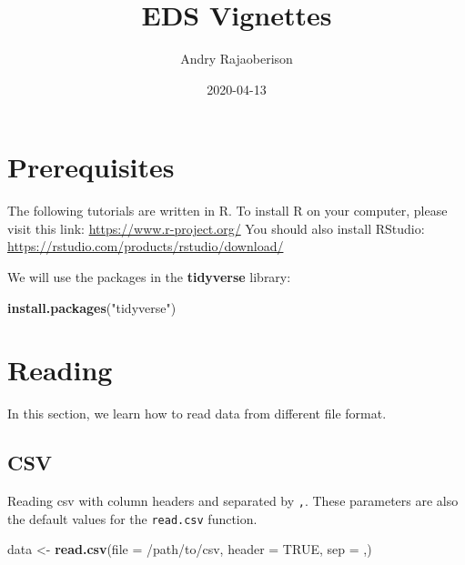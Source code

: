 \documentclass[
]{book}
\title{EDS Vignettes}
\author{Andry Rajaoberison}
\date{2020-04-13}
\newenvironment{Shaded}{\begin{snugshade}}{\end{snugshade}}
\newcommand{\DataTypeTok}[1]{\textcolor[rgb]{0.13,0.29,0.53}{#1}}
\newcommand{\KeywordTok}[1]{\textcolor[rgb]{0.13,0.29,0.53}{\textbf{#1}}}
\newcommand{\NormalTok}[1]{#1}
\newcommand{\OtherTok}[1]{\textcolor[rgb]{0.56,0.35,0.01}{#1}}
\newcommand{\StringTok}[1]{\textcolor[rgb]{0.31,0.60,0.02}{#1}}
\begin{document}
\maketitle

{
\setcounter{tocdepth}{1}
\tableofcontents
}
\hypertarget{prerequisites}{%
\chapter*{Prerequisites}\label{prerequisites}}

The following tutorials are written in R. To install R on your computer, please visit this link: \url{https://www.r-project.org/}
You should also install RStudio: \url{https://rstudio.com/products/rstudio/download/}

We will use the packages in the \textbf{tidyverse} library:

\begin{Shaded}
\begin{Highlighting}[]
\KeywordTok{install.packages}\NormalTok{(}\StringTok{"tidyverse"}\NormalTok{)}
\end{Highlighting}
\end{Shaded}

\hypertarget{reading}{%
\chapter{Reading}\label{reading}}

In this section, we learn how to read data from different file format.

\hypertarget{csv}{%
\section{CSV}\label{csv}}

Reading csv with column headers and separated by \texttt{,}. These parameters are also the default values for the \texttt{read.csv} function.

\begin{Shaded}
\begin{Highlighting}[]
\NormalTok{data \textless{}{-}}\StringTok{ }\KeywordTok{read.csv}\NormalTok{(}\DataTypeTok{file =} \StringTok{\textquotesingle{}/path/to/csv\textquotesingle{}}\NormalTok{, }\DataTypeTok{header =} \OtherTok{TRUE}\NormalTok{, }\DataTypeTok{sep =} \StringTok{\textquotesingle{},\textquotesingle{}}\NormalTok{)}
\end{Highlighting}
\end{Shaded}
\end{document}
